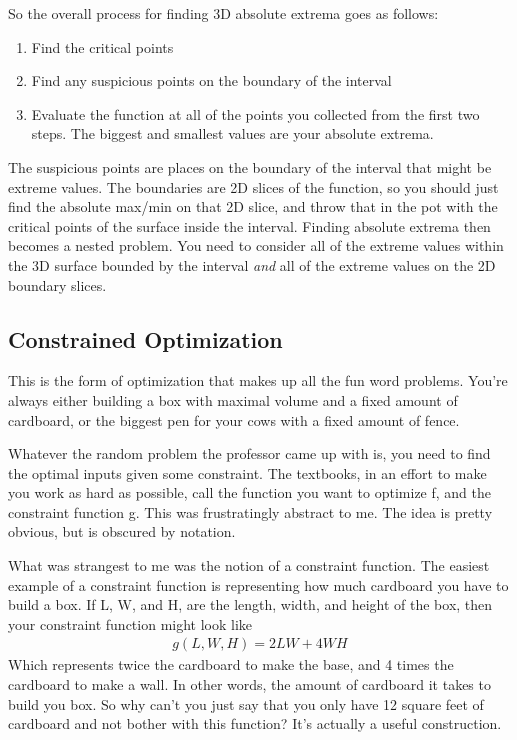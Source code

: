\documentclass[12pt, letterpaper]{article}
\begin{document}
So the overall process for finding 3D absolute extrema goes as follows:
\begin{enumerate}
    \item Find the critical points
    \item Find any suspicious points on the boundary of the interval
    \item Evaluate the function at all of the points you collected from the first two steps. The biggest and smallest values are your absolute extrema.
\end{enumerate}
The suspicious points are places on the boundary of the interval that might be extreme values.
The boundaries are 2D slices of the function, so you should just find the absolute max/min on that 2D slice, and throw that in the pot with the critical points of the surface inside the interval.
Finding absolute extrema then becomes a nested problem.
You need to consider all of the extreme values within the 3D surface bounded by the interval \emph{and} all of the extreme values on the 2D boundary slices. 

\subsection{Constrained Optimization}
This is the form of optimization that makes up all the fun word problems.
You're always either building a box with maximal volume and a fixed amount of cardboard,
or the biggest pen for your cows with a fixed amount of fence.

Whatever the random problem the professor came up with is, you need to find the optimal inputs given some constraint.
The textbooks, in an effort to make you work as hard as possible, call the function you want to optimize f, and the constraint function g.
This was frustratingly abstract to me. The idea is pretty obvious, but is obscured by notation.

What was strangest to me was the notion of a constraint function.
The easiest example of a constraint function is representing how much cardboard you have to build a box.
If L, W, and H, are the length, width, and height of the box, then your constraint function might look like
\begin{gather*}
    g(L, W, H) = 2LW + 4WH
\end{gather*}
Which represents twice the cardboard to make the base, and 4 times the cardboard to make a wall.
In other words, the amount of cardboard it takes to build you box.
So why can't you just say that you only have 12 square feet of cardboard and not bother with this function?
It's actually a useful construction.
\end{document}
